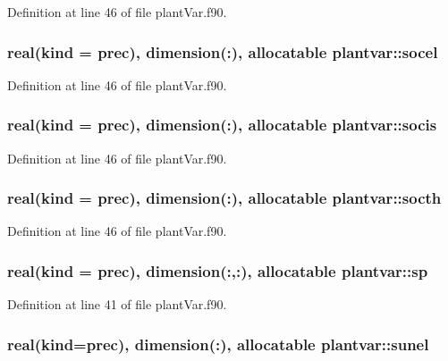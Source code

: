 Definition at line 46 of file plant\-Var.\-f90.

\hypertarget{classplantvar_a325e0974aedb888a4814e7d9479c67d3}{
\subsubsection[{socel}]{\setlength{\rightskip}{0pt plus 5cm}real(kind = prec), dimension(\-:), allocatable plantvar\-::socel}}\label{classplantvar_a325e0974aedb888a4814e7d9479c67d3}


Definition at line 46 of file plant\-Var.\-f90.

\hypertarget{classplantvar_ab4064b573be9c1b9c4d96298feb717d5}{
\subsubsection[{socis}]{\setlength{\rightskip}{0pt plus 5cm}real(kind = prec), dimension(\-:), allocatable plantvar\-::socis}}\label{classplantvar_ab4064b573be9c1b9c4d96298feb717d5}


Definition at line 46 of file plant\-Var.\-f90.

\hypertarget{classplantvar_a9cdc1767d27c7362b6c33bc24fbe79ed}{
\subsubsection[{socth}]{\setlength{\rightskip}{0pt plus 5cm}real(kind = prec), dimension(\-:), allocatable plantvar\-::socth}}\label{classplantvar_a9cdc1767d27c7362b6c33bc24fbe79ed}


Definition at line 46 of file plant\-Var.\-f90.

\hypertarget{classplantvar_a0ecfac9070622328232608ce808ede2b}{
\subsubsection[{sp}]{\setlength{\rightskip}{0pt plus 5cm}real(kind = prec), dimension(\-:,\-:), allocatable plantvar\-::sp}}\label{classplantvar_a0ecfac9070622328232608ce808ede2b}


Definition at line 41 of file plant\-Var.\-f90.

\hypertarget{classplantvar_ae2c75e1880b14179e8c96c8bd209f26d}{
\subsubsection[{sunel}]{\setlength{\rightskip}{0pt plus 5cm}real(kind=prec), dimension(\-:), allocatable plantvar\-::sunel}}\label{classplantvar_ae2c75e1880b14179e8c96c8bd209f26d}


